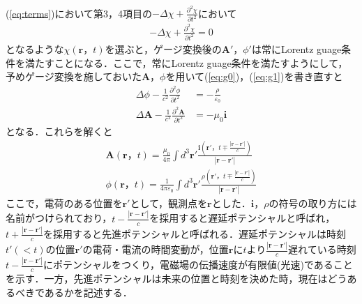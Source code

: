 \documentclass[a4j,10pt,oneside,openany]{jsbook}
\newcommand{\vi}{\boldsymbol{i}}
\newcommand{\vr}{\boldsymbol{r}}
\newcommand{\vA}{\boldsymbol{A}}
\newcommand{\del}{\partial}
\begin{document}
{\begin{align}
\end{align}
(\ref{eq:terms})において第3，4項目の$-\Delta\chi+\frac{\del^2\chi}{\del t^2}$において
\begin{align}
  -\Delta\chi+\frac{\del^2\chi}{\del t^2}=0
\end{align}
となるような$\chi(\vr，t)$を選ぶと，ゲージ変換後の$\vA'，\phi'$は常にLorentz guage条件を満たすことになる．ここで，常にLorentz guage条件を満たすようにして，予めゲージ変換を施しておいた$\vA，\phi$を用いて(\ref{eq:g0})，(\ref{eq:g1})を書き直すと
\begin{align}
  \Delta \phi- \frac{1}{c^2}\frac{\del^2 \phi}{\del t^2}&= -\frac{\rho}{\varepsilon_0} \label{eq:phi}\\
  \Delta\vA-\frac{1}{c^2} \frac{\del^2 \vA}{\del t^2} &= -\mu_0 \vi \label{eq:A}
\end{align}
となる．これらを解くと
\begin{align}
  \vA(\vr，t) =\frac{\mu_0}{4\pi}\int d^3\vr'\frac{\vi\left(\vr'，t\mp\frac{|\vr-\vr'|}{c}\right)}{|\vr-\vr'|}\label{eq:sol_A}\\
  \phi(\vr，t)=\frac{1}{4\pi\varepsilon_0}\int d^3\vr'\frac{\rho\left(\vr'，t\mp\frac{|\vr-\vr'|}{c}\right)}{|\vr-\vr'|}
\end{align}
ここで，電荷のある位置を$\vr'$として，観測点を$\vr$とした．$\vi，\rho$の符号の取り方には名前がつけられており，$t-\frac{|\vr-\vr'|}{c}$を採用すると遅延ポテンシャルと呼ばれ，$t+\frac{|\vr-\vr'|}{c}$を採用すると先進ポテンシャルと呼ばれる．遅延ポテンシャルは時刻$t'(<t)$の位置$\vr'$の電荷・電流の時間変動が，位置$\vr$に$t$より$\frac{|\vr-\vr'|}{c}$遅れている時刻$t-\frac{|\vr-\vr'|}{c}$にポテンシャルをつくり，電磁場の伝播速度が有限値(光速)であることを示す．一方，先進ポテンシャルは未来の位置と時刻を決めた時，現在はどうあるべきであるかを記述する．

}
\end{document}
